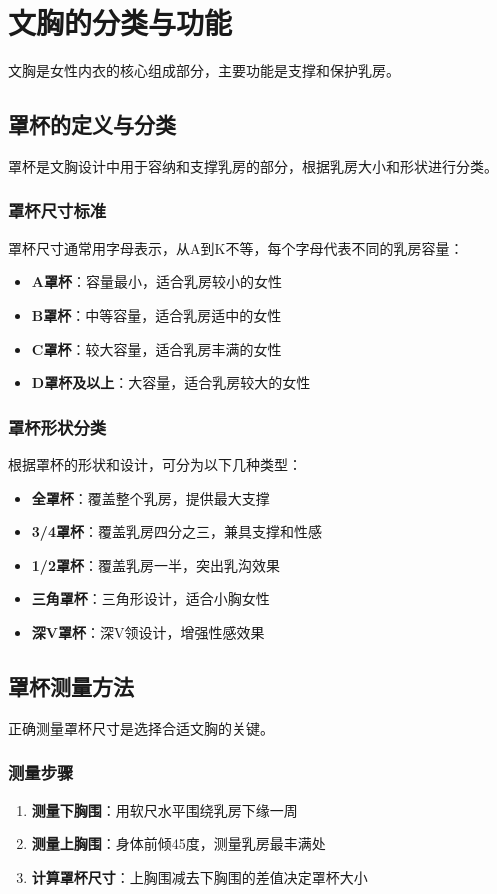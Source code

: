 \documentclass[12pt,UTF8]{ctexbook}
\begin{document}
\section{文胸的分类与功能}
文胸是女性内衣的核心组成部分，主要功能是支撑和保护乳房。

\subsection{罩杯的定义与分类}
罩杯是文胸设计中用于容纳和支撑乳房的部分，根据乳房大小和形状进行分类。

\subsubsection{罩杯尺寸标准}
罩杯尺寸通常用字母表示，从A到K不等，每个字母代表不同的乳房容量：
\begin{itemize}[leftmargin=2cm]
	\item \textbf{A罩杯}：容量最小，适合乳房较小的女性
	\item \textbf{B罩杯}：中等容量，适合乳房适中的女性
	\item \textbf{C罩杯}：较大容量，适合乳房丰满的女性
	\item \textbf{D罩杯及以上}：大容量，适合乳房较大的女性
\end{itemize}

\subsubsection{罩杯形状分类}
根据罩杯的形状和设计，可分为以下几种类型：
\begin{itemize}[leftmargin=2cm]
	\item \textbf{全罩杯}：覆盖整个乳房，提供最大支撑
	\item \textbf{3/4罩杯}：覆盖乳房四分之三，兼具支撑和性感
	\item \textbf{1/2罩杯}：覆盖乳房一半，突出乳沟效果
	\item \textbf{三角罩杯}：三角形设计，适合小胸女性
	\item \textbf{深V罩杯}：深V领设计，增强性感效果
\end{itemize}

\subsection{罩杯测量方法}
正确测量罩杯尺寸是选择合适文胸的关键。

\subsubsection{测量步骤}
\begin{enumerate}[leftmargin=2cm]
	\item \textbf{测量下胸围}：用软尺水平围绕乳房下缘一周
	\item \textbf{测量上胸围}：身体前倾45度，测量乳房最丰满处
	\item \textbf{计算罩杯尺寸}：上胸围减去下胸围的差值决定罩杯大小
\end{enumerate}
\end{document}
